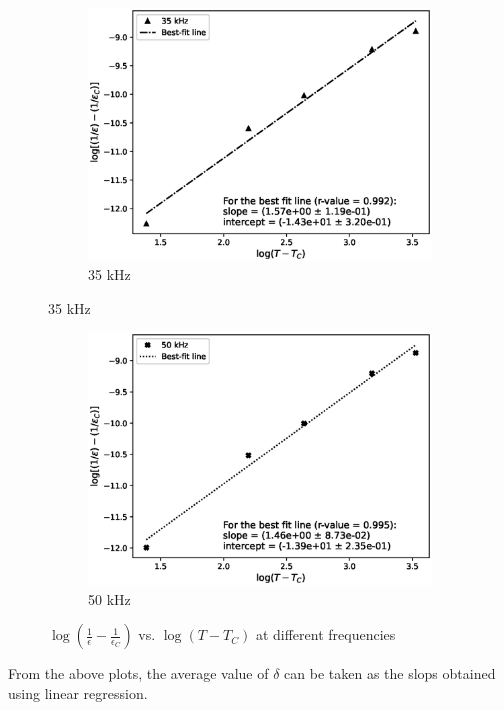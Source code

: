 \begin{figure}[H]
		\begin{subfigure}{\linewidth}
		\includegraphics[width=1\textwidth]{images/TC35.eps}
		\caption{35 kHz}
		\end{subfigure}
	\end{figure}

	\begin{figure}[H]
		\ContinuedFloat
		\begin{subfigure}{\linewidth}
		\includegraphics[width=1\textwidth]{images/TC50.eps}
		\caption{50 kHz}
		\end{subfigure}

		\caption{$\log(\frac{1}{\epsilon}-\frac{1}{\epsilon_C})$ vs. $\log(T-T_C)$ at different frequencies}
		\label{final}
	\end{figure}
		
	From the above plots, the average value of $\delta$ can be taken as the slops obtained using linear regression.